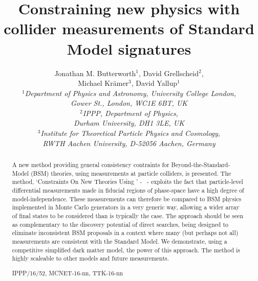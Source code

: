 \documentclass[floatfix]{article}
\title{Constraining new physics with collider measurements of Standard Model signatures}
\author{Jonathan M. Butterworth$^1$, David Grellscheid$^2$,\\[1mm] Michael Kr\"amer$^3$, David Yallup$^1$\\[2.5mm]
\it $^1$Department of Physics and Astronomy, University College London,\\ \it Gower St., London, WC1E 6BT, UK\\[1mm]
\it $^2$IPPP, Department of Physics,\\\it Durham University, DH1 3LE, UK\\[1mm] \it $^3$Institute for Theoretical Particle Physics and Cosmology, \\ \it RWTH Aachen University, D-52056 Aachen, Germany}
\begin{document}
\maketitle 

\begin{abstract}
A new method providing general consistency contraints for Beyond-the-Standard-Model (BSM) theories, using 
measurements at particle colliders, is presented. The method, `Constraints On New Theories Using \rivet' - \Contur \ - exploits
the fact that particle-level differential measurements made in fiducial regions of phase-space have a high degree of
model-independence. These measurements can therefore be compared to BSM physics implemented in Monte Carlo generators in a very
generic way, allowing a wider array of final states to be considered than is typically the case. The \Contur approach should be seen
as complementary to the discovery potential of direct searches, being designed to eliminate inconsistent 
BSM proposals in a context where many (but perhaps not all) measurements are consistent with the Standard Model.
We demonstrate, using a competitive simplified dark matter model, the power of this approach. 
The \Contur method is highly scaleable to other models and future measurements.
%
\begin{flushright}IPPP/16/52, MCNET-16-nn, TTK-16-nn\end{flushright}
\end{abstract}
\end{document}
